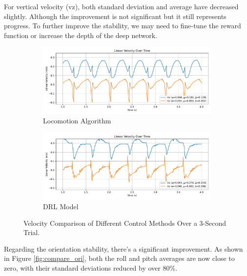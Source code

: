 \documentclass[a4paper,11pt]{article}
\begin{document}
For vertical velocity (vz), both standard deviation and average have decreased slightly. Although the improvement is not significant but it still represents progress.
To further improve the stability, we may need to fine-tune the reward function or increase the depth of the deep network.

\begin{figure}[H]
	\centering
	\begin{subfigure}[b]{0.7\textwidth}
			\centering
			\includegraphics[width=\linewidth]{../../assets/alg_vel.pdf}
			\caption{Locomotion Algorithm}
	\end{subfigure}
	\vfill
	\begin{subfigure}[b]{0.7\textwidth}
			\centering
			\includegraphics[width=\linewidth]{../../assets/model_vel.pdf}
			\caption{DRL Model}
	\end{subfigure}
	\caption{Velocity Comparison of Different Control Methods Over a 3-Second Trial.}
	\label{fig:compare_vel}
\end{figure}

Regarding the orientation stability, there's a significant improvement. As shown in Figure \ref{fig:compare_ori},
both the roll and pitch averages are now close to zero, with their standard deviations reduced by over 80\%.
\end{document}
